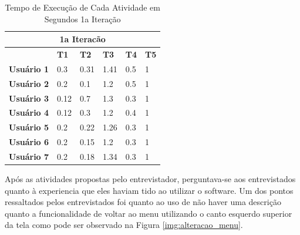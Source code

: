 \begin{table}[h!]
\centering
\caption{Tempo de Execução de Cada Atividade em Segundos 1a Iteração}
\label{tabela_iteracao1}
\begin{tabular}{|llllll|}
\hline
\multicolumn{6}{|c|}{\cellcolor[HTML]{C0C0C0}\textbf{1a Iteracão}}                     \\ \hline
                   & \textbf{T1} & \textbf{T2} & \textbf{T3} & \textbf{T4} & \textbf{T5} \\ \hline
\textbf{Usuário 1} & 0.3         & 0.31        & 1.41        & 0.5         & 1           \\ \hline
\textbf{Usuário 2} & 0.2         & 0.1         & 1.2         & 0.5         & 1           \\ \hline
\textbf{Usuário 3} & 0.12        & 0.7         & 1.3         & 0.3         & 1           \\ \hline
\textbf{Usuário 4} & 0.12        & 0.3         & 1.2         & 0.4         & 1           \\ \hline
\textbf{Usuário 5} & 0.2         & 0.22        & 1.26        & 0.3         & 1           \\ \hline
\textbf{Usuário 6} & 0.2         & 0.15        & 1.2         & 0.3         & 1           \\ \hline
\textbf{Usuário 7} & 0.2         & 0.18        & 1.34        & 0.3         & 1           \\ \hline
\end{tabular}
\end{table}


Após as atividades propostas pelo entrevistador, perguntava-se aos entrevistados quanto à experiencia que eles haviam tido ao utilizar o software. Um dos pontos ressaltados pelos entrevistados foi quanto ao uso de não haver uma descrição quanto a funcionalidade de voltar ao menu utilizando o canto esquerdo superior da tela como pode ser observado na Figura \ref{img:alteracao_menu}. 

